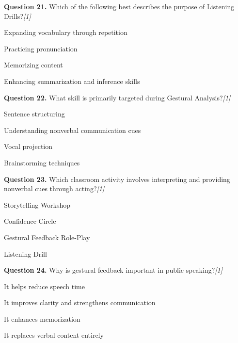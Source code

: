 \documentclass[11pt,a4paper]{article}
\newcommand{\pts}[1]{\hfill   \textit{[#1]}}
\begin{document}
\medskip


\noindent   \textbf{Question 21.} Which of the following best describes the purpose of Listening Drills?\pts{1}

\begin{parts}
  \item Expanding vocabulary through repetition
  \item Practicing pronunciation
  \item Memorizing content
  \item Enhancing summarization and inference skills
\end{parts}

\medskip


\noindent   \textbf{Question 22.} What skill is primarily targeted during Gestural Analysis?\pts{1}

\begin{parts}
  \item Sentence structuring
  \item Understanding nonverbal communication cues
  \item Vocal projection
  \item Brainstorming techniques
\end{parts}

\medskip


\noindent   \textbf{Question 23.} Which classroom activity involves interpreting and providing nonverbal cues through acting?\pts{1}

\begin{parts}
  \item Storytelling Workshop
  \item Confidence Circle
  \item Gestural Feedback Role-Play
  \item Listening Drill
\end{parts}

\medskip


\noindent   \textbf{Question 24.} Why is gestural feedback important in public speaking?\pts{1}

\begin{parts}
  \item It helps reduce speech time
  \item It improves clarity and strengthens communication
  \item It enhances memorization
  \item It replaces verbal content entirely
\end{parts}
\end{document}
